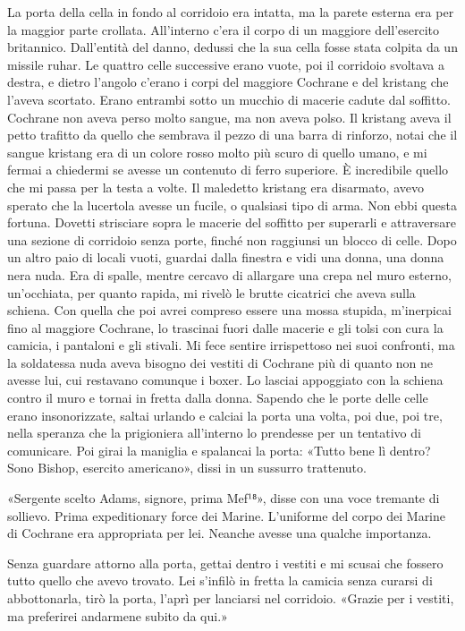 La porta della cella in fondo al corridoio era intatta, ma la parete
esterna era per la maggior parte crollata. All'interno c'era il corpo di
un maggiore dell'esercito britannico. Dall'entità del danno, dedussi che
la sua cella fosse stata colpita da un missile ruhar. Le quattro celle
successive erano vuote, poi il corridoio svoltava a destra, e dietro
l'angolo c'erano i corpi del maggiore Cochrane e del kristang che
l'aveva scortato. Erano entrambi sotto un mucchio di macerie cadute dal
soffitto. Cochrane non aveva perso molto sangue, ma non aveva polso. Il
kristang aveva il petto trafitto da quello che sembrava il pezzo di una
barra di rinforzo, notai che il sangue kristang era di un colore rosso
molto più scuro di quello umano, e mi fermai a chiedermi se avesse un
contenuto di ferro superiore. È incredibile quello che mi passa per la
testa a volte. Il maledetto kristang era disarmato, avevo sperato che la
lucertola avesse un fucile, o qualsiasi tipo di arma. Non ebbi questa
fortuna. Dovetti strisciare sopra le macerie del soffitto per superarli
e attraversare una sezione di corridoio senza porte, finché non
raggiunsi un blocco di celle. Dopo un altro paio di locali vuoti,
guardai dalla finestra e vidi una donna, una donna nera nuda. Era di
spalle, mentre cercavo di allargare una crepa nel muro esterno,
un'occhiata, per quanto rapida, mi rivelò le brutte cicatrici che aveva
sulla schiena. Con quella che poi avrei compreso essere una mossa
stupida, m'inerpicai fino al maggiore Cochrane, lo trascinai fuori dalle
macerie e gli tolsi con cura la camicia, i pantaloni e gli stivali. Mi
fece sentire irrispettoso nei suoi confronti, ma la soldatessa nuda
aveva bisogno dei vestiti di Cochrane più di quanto non ne avesse lui,
cui restavano comunque i boxer. Lo lasciai appoggiato con la schiena
contro il muro e tornai in fretta dalla donna. Sapendo che le porte
delle celle erano insonorizzate, saltai urlando e calciai la porta una
volta, poi due, poi tre, nella speranza che la prigioniera all'interno
lo prendesse per un tentativo di comunicare. Poi girai la maniglia e
spalancai la porta: «Tutto bene lì dentro? Sono Bishop, esercito
americano», dissi in un sussurro trattenuto.

«Sergente scelto Adams, signore, prima Mef¹⁸», disse con una voce
tremante di sollievo. Prima expeditionary force dei Marine. L'uniforme
del corpo dei Marine di Cochrane era appropriata per lei. Neanche avesse
una qualche importanza.

Senza guardare attorno alla porta, gettai dentro i vestiti e mi scusai
che fossero tutto quello che avevo trovato. Lei s'infilò in fretta la
camicia senza curarsi di abbottonarla, tirò la porta, l'aprì per
lanciarsi nel corridoio. «Grazie per i vestiti, ma preferirei andarmene
subito da qui.»


